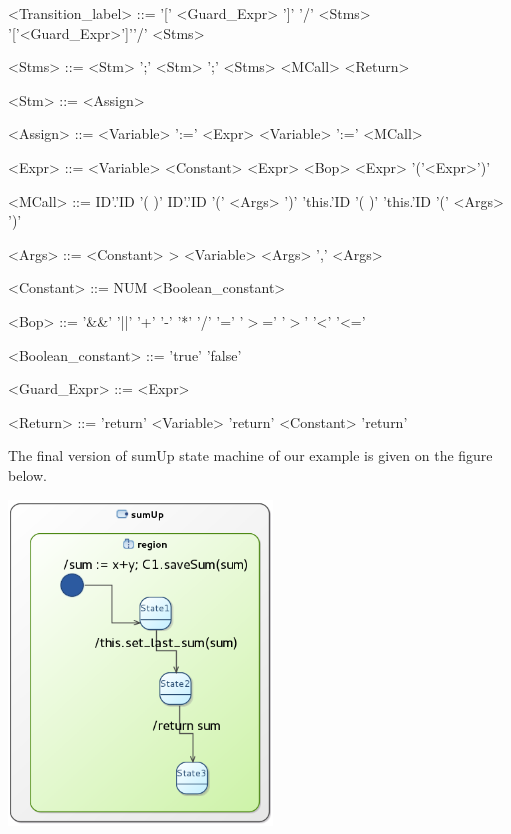\documentclass[12pt]{article}
\begin{document}
\begin{grammar}

<Transition_label> ::= '[' <Guard_Expr> ']' \alt '/' <Stms> \alt  '['<Guard_Expr>']'\alt '/' <Stms>

<Stms> ::= <Stm> ';' \alt <Stm> ';' <Stms> \alt <MCall> \alt <Return>

<Stm> ::= <Assign> 

<Assign> ::= <Variable> ':='  <Expr> \alt <Variable> ':=' <MCall>

<Expr> ::=  <Variable> \alt <Constant> \alt  <Expr> <Bop> <Expr> \alt '('<Expr>')'

<MCall> ::= ID'.'ID '( )' \alt 
	 ID'.'ID '(' <Args> ')' \alt 
	 'this.'ID '( )' \alt 
	'this.'ID  '(' <Args> ')'
	 
<Args> ::=  <Constant> \alt> <Variable> \alt <Args> ',' <Args>

<Constant> ::= NUM \alt <Boolean_constant>

<Bop> ::=  '\&\&' \alt  '||'  \alt '+' \alt '-' \alt '*' \alt '/' \alt '=' \alt '$>$=' \alt '$>$' \alt '\textless'  \alt '\textless='

<Boolean_constant> ::= 'true' \alt 'false'

<Guard_Expr> ::= <Expr>

<Return> ::= 'return' <Variable> \alt 'return' <Constant> \alt  'return'

\end{grammar}

The final version of sumUp state machine of our example is given on the figure below.

     \centerline{
     \includegraphics[width=7cm]{draws/sm.png}
     \label{fig:vce-proj}
     }
\end{document}

